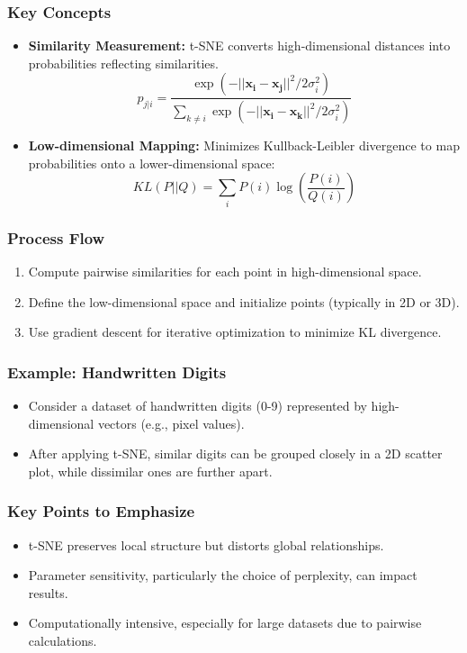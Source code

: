 \documentclass[aspectratio=169]{beamer}
\begin{document}
\begin{frame}
    \frametitle{Key Concepts}
    \begin{itemize}
        \item \textbf{Similarity Measurement:} t-SNE converts high-dimensional distances into probabilities reflecting similarities.
        \begin{equation}
            p_{j|i} = \frac{\exp(-||\mathbf{x_i} - \mathbf{x_j}||^2 / 2\sigma_i^2)}{\sum_{k \neq i} \exp(-||\mathbf{x_i} - \mathbf{x_k}||^2 / 2\sigma_i^2)}
        \end{equation}
        
        \item \textbf{Low-dimensional Mapping:} Minimizes Kullback-Leibler divergence to map probabilities onto a lower-dimensional space:
        \begin{equation}
            KL(P || Q) = \sum_{i} P(i) \log \left(\frac{P(i)}{Q(i)}\right)
        \end{equation}
    \end{itemize}
\end{frame}

\begin{frame}
    \frametitle{Process Flow}
    \begin{enumerate}
        \item Compute pairwise similarities for each point in high-dimensional space.
        \item Define the low-dimensional space and initialize points (typically in 2D or 3D).
        \item Use gradient descent for iterative optimization to minimize KL divergence.
    \end{enumerate}
\end{frame}

\begin{frame}
    \frametitle{Example: Handwritten Digits}
    \begin{itemize}
        \item Consider a dataset of handwritten digits (0-9) represented by high-dimensional vectors (e.g., pixel values).
        \item After applying t-SNE, similar digits can be grouped closely in a 2D scatter plot, while dissimilar ones are further apart.
    \end{itemize}
\end{frame}

\begin{frame}
    \frametitle{Key Points to Emphasize}
    \begin{itemize}
        \item t-SNE preserves local structure but distorts global relationships.
        \item Parameter sensitivity, particularly the choice of perplexity, can impact results.
        \item Computationally intensive, especially for large datasets due to pairwise calculations.
    \end{itemize}
\end{frame}
\end{document}
